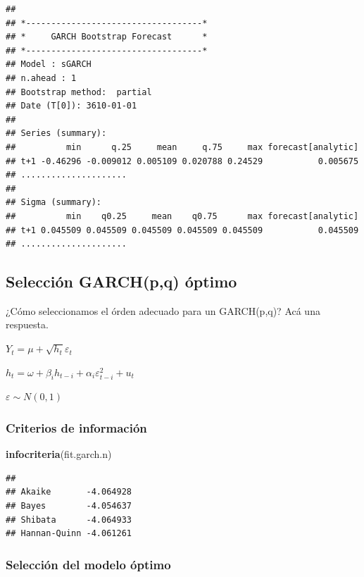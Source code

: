 \documentclass[
]{book}
\newenvironment{Shaded}{\begin{snugshade}}{\end{snugshade}}
\newcommand{\FunctionTok}[1]{\textcolor[rgb]{0.13,0.29,0.53}{\textbf{#1}}}
\newcommand{\NormalTok}[1]{#1}
\begin{document}
\begin{verbatim}
## 
## *-----------------------------------*
## *     GARCH Bootstrap Forecast      *
## *-----------------------------------*
## Model : sGARCH
## n.ahead : 1
## Bootstrap method:  partial
## Date (T[0]): 3610-01-01
## 
## Series (summary):
##          min      q.25     mean     q.75     max forecast[analytic]
## t+1 -0.46296 -0.009012 0.005109 0.020788 0.24529           0.005675
## .....................
## 
## Sigma (summary):
##          min    q0.25     mean    q0.75      max forecast[analytic]
## t+1 0.045509 0.045509 0.045509 0.045509 0.045509           0.045509
## .....................
\end{verbatim}

\hypertarget{selecciuxf3n-garchpq-uxf3ptimo}{%
\subsection{Selección GARCH(p,q) óptimo}\label{selecciuxf3n-garchpq-uxf3ptimo}}

¿Cómo seleccionamos el órden adecuado para un GARCH(p,q)? Acá una respuesta.

\(Y_t = \mu+\sqrt{h_t}\varepsilon_t\)

\(h_t = \omega+\beta_ih_{t-i}+\alpha_i\varepsilon^2_{t-i}+u_t\)

\(\varepsilon \sim N(0,1)\)

\hypertarget{criterios-de-informaciuxf3n}{%
\subsubsection{Criterios de información}\label{criterios-de-informaciuxf3n}}

\begin{Shaded}
\begin{Highlighting}[]
\FunctionTok{infocriteria}\NormalTok{(fit.garch.n)}
\end{Highlighting}
\end{Shaded}

\begin{verbatim}
##                       
## Akaike       -4.064928
## Bayes        -4.054637
## Shibata      -4.064933
## Hannan-Quinn -4.061261
\end{verbatim}

\hypertarget{selecciuxf3n-del-modelo-uxf3ptimo}{%
\subsubsection{Selección del modelo óptimo}\label{selecciuxf3n-del-modelo-uxf3ptimo}}
\end{document}
